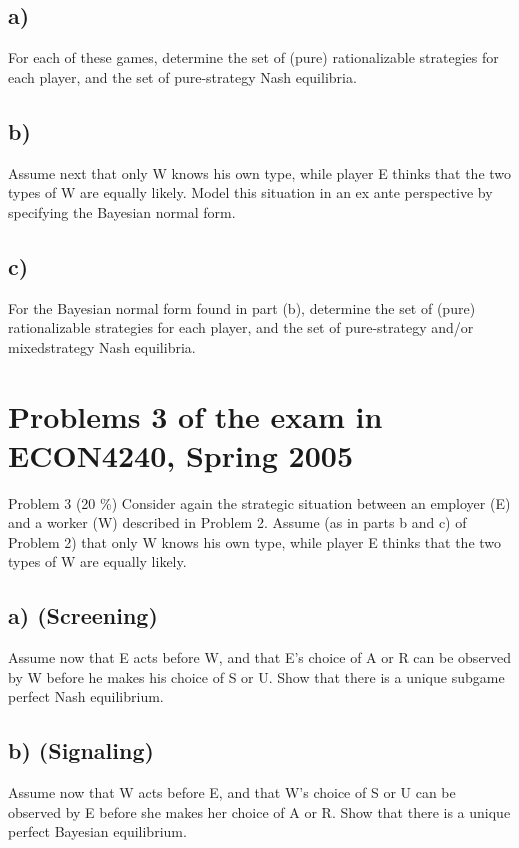 \documentclass{article}
\begin{document}
\subsection*{a)} For each of these games, determine the set of (pure) rationalizable strategies for each
player, and the set of pure-strategy Nash equilibria.
\subsection*{b)} Assume next that only W knows his own type, while player E thinks that the two types
of W are equally likely. Model this situation in an ex ante perspective by specifying
the Bayesian normal form.
\subsection*{c)} For the Bayesian normal form found in part (b), determine the set of (pure)
rationalizable strategies for each player, and the set of pure-strategy and/or mixedstrategy Nash equilibria.

\section{Problems 3  of the exam in ECON4240, Spring 2005}

Problem 3 (20 \%)
Consider again the strategic situation between an employer (E) and a worker (W) described in
Problem 2. Assume (as in parts b and c) of Problem 2) that only W knows his own type, while
player E thinks that the two types of W are equally likely.
\subsection*{a) (Screening)} Assume now that E acts before W, and that E's choice of A or R can be
observed by W before he makes his choice of S or U. Show that there is a unique
subgame perfect Nash equilibrium.
\subsection*{b) (Signaling)} Assume now that W acts before E, and that W's choice of S or U can be
observed by E before she makes her choice of A or R. Show that there is a unique
perfect Bayesian equilibrium.
\end{document}
